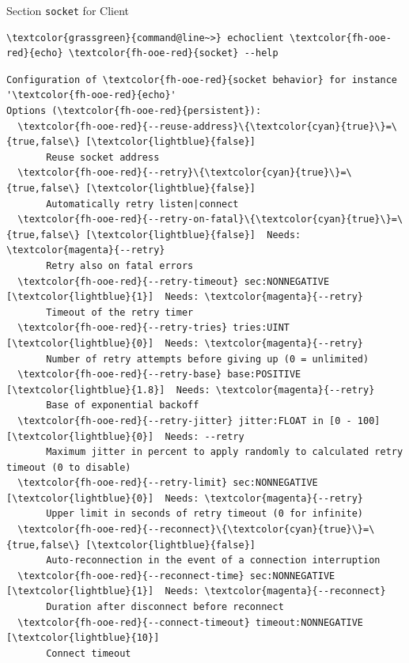 \begin{frame}[fragile]{Section \alert{\lstinline|socket|} for Client}
\begin{scriptsize}
\begin{Verbatim}[commandchars=\\\{\}]
\textcolor{grassgreen}{command@line~>} echoclient \textcolor{fh-ooe-red}{echo} \textcolor{fh-ooe-red}{socket} --help
\end{Verbatim}
\begin{Verbatim}[commandchars=\\\{\},frame=leftline,rulecolor=\color{fh-ooe-red}]
Configuration of \textcolor{fh-ooe-red}{socket behavior} for instance '\textcolor{fh-ooe-red}{echo}'
Options (\textcolor{fh-ooe-red}{persistent}):
  \textcolor{fh-ooe-red}{--reuse-address}\{\textcolor{cyan}{true}\}=\{true,false\} [\textcolor{lightblue}{false}]
       Reuse socket address
  \textcolor{fh-ooe-red}{--retry}\{\textcolor{cyan}{true}\}=\{true,false\} [\textcolor{lightblue}{false}]
       Automatically retry listen|connect
  \textcolor{fh-ooe-red}{--retry-on-fatal}\{\textcolor{cyan}{true}\}=\{true,false\} [\textcolor{lightblue}{false}]  Needs: \textcolor{magenta}{--retry}
       Retry also on fatal errors
  \textcolor{fh-ooe-red}{--retry-timeout} sec:NONNEGATIVE [\textcolor{lightblue}{1}]  Needs: \textcolor{magenta}{--retry}
       Timeout of the retry timer
  \textcolor{fh-ooe-red}{--retry-tries} tries:UINT [\textcolor{lightblue}{0}]  Needs: \textcolor{magenta}{--retry}
       Number of retry attempts before giving up (0 = unlimited)
  \textcolor{fh-ooe-red}{--retry-base} base:POSITIVE [\textcolor{lightblue}{1.8}]  Needs: \textcolor{magenta}{--retry}
       Base of exponential backoff
  \textcolor{fh-ooe-red}{--retry-jitter} jitter:FLOAT in [0 - 100] [\textcolor{lightblue}{0}]  Needs: --retry
       Maximum jitter in percent to apply randomly to calculated retry timeout (0 to disable)
  \textcolor{fh-ooe-red}{--retry-limit} sec:NONNEGATIVE [\textcolor{lightblue}{0}]  Needs: \textcolor{magenta}{--retry}
       Upper limit in seconds of retry timeout (0 for infinite)
  \textcolor{fh-ooe-red}{--reconnect}\{\textcolor{cyan}{true}\}=\{true,false\} [\textcolor{lightblue}{false}]
       Auto-reconnection in the event of a connection interruption
  \textcolor{fh-ooe-red}{--reconnect-time} sec:NONNEGATIVE [\textcolor{lightblue}{1}]  Needs: \textcolor{magenta}{--reconnect}
       Duration after disconnect before reconnect
  \textcolor{fh-ooe-red}{--connect-timeout} timeout:NONNEGATIVE [\textcolor{lightblue}{10}]
       Connect timeout
\end{Verbatim}
\end{scriptsize}
\end{frame}
